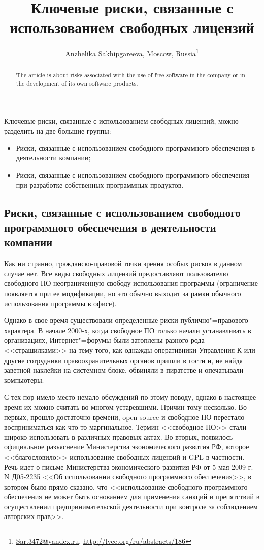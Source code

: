 \documentclass[10pt, a5paper]{article}
\begin{document}
\title{Ключевые риски, связанные с использованием свободных лицензий}
\author{Anzhelika Sakhipgareeva, Moscow, Russia\footnote{\url{Sar.3472@yandex.ru}, \url{http://lvee.org/ru/abstracts/186}}}
\maketitle
\begin{abstract}
The article is about risks associated with the use of free software in the company or in the development of its own software products.
\end{abstract}

Ключевые риски, связанные с использованием свободных лицензий, можно разделить на две большие группы:

\begin{itemize}
  \item Риски, связанные с использованием свободного программного обеспечения в деятельности компании;
  \item Риски, связанные с использованием свободного программного обеспечения при разработке собственных программных продуктов.
\end{itemize}

\subsection*{Риски, связанные с использованием свободного \\ программного обеспечения в деятельности компании}

Как ни странно, гражданско-правовой точки зрения особых рисков в данном случае нет. Все виды свободных лицензий предоставляют пользователю свободного ПО неограниченную свободу использования программы (ограничение появляется при ее модификации, но это обычно выходит за рамки обычного использования программы в офисе).

Однако в свое время существовали определенные риски публично"=правового характера. В начале 2000-х, когда свободное ПО только начали устанавливать в организациях, Интернет"=форумы были затоплены разного рода <<страшилками>> на тему того, как однажды оперативники Управления К или другие сотрудники правоохранительных органов пришли в гости и, не найдя заветной наклейки на системном блоке, обвиняли в пиратстве и опечатывали компьютеры.

С тех пор имело место немало обсуждений по этому поводу, однако в настоящее время их можно считать во многом устаревшими. Причин тому несколько. Во-первых, прошло достаточно времени, open source и свободное ПО перестало восприниматься как что-то маргинальное. Термин <<свободное ПО>> стали широко использовать в различных правовых актах. Во-вторых, появилось официальное разъяснение Министерства экономического развития РФ, которое <<благословило>> использование свободных лицензий и GPL в частности. Речь идет о письме Министерства экономического развития РФ от 5 мая 2009 г. N Д05-2235 <<Об использовании свободного программного обеспечения>>, в котором было прямо сказано, что <<использование свободного программного обеспечения не может быть основанием для применения санкций и препятствий в осуществлении предпринимательской деятельности при контроле за соблюдением авторских прав>>.
\end{document}
